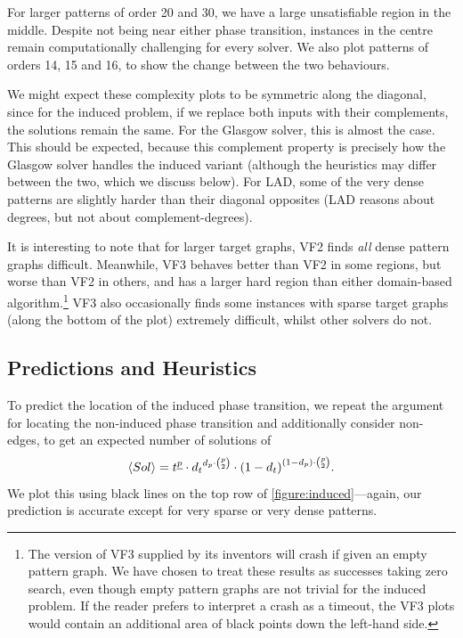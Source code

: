 \documentclass[twoside,11pt]{article}
\begin{document}
For larger patterns of order 20 and 30, we have a large unsatisfiable region in the middle. Despite
not being near either phase transition, instances in the centre remain computationally challenging
for every solver.  We also plot patterns of orders 14, 15 and 16, to show the change between the two
behaviours.

We might expect these complexity plots to be symmetric along the diagonal, since for the induced
problem, if we replace both inputs with their complements, the solutions remain the same.  For the
Glasgow solver, this is almost the case. This should be expected, because this complement property is
precisely how the Glasgow solver handles the induced variant (although the heuristics may differ
between the two, which we discuss below). For LAD, some of the very dense patterns are slightly
harder than their diagonal opposites (LAD reasons about degrees, but not about complement-degrees).

It is interesting to note that for larger target graphs, VF2 finds \emph{all} dense pattern graphs
difficult. Meanwhile, VF3 behaves better than VF2 in some regions, but worse than VF2 in others, and
has a larger hard region than either domain-based algorithm.\footnote{The version of
VF3 supplied by its inventors will crash if given an empty pattern graph. We have chosen to treat
these results as successes taking zero search, even though empty pattern graphs are not trivial for
the induced problem. If the reader prefers to interpret a crash as a timeout, the VF3 plots would
contain an additional area of black points down the left-hand side.} VF3 also occasionally finds
some instances with sparse target graphs (along the bottom of the plot) extremely difficult, whilst
other solvers do not.

\subsection{Predictions and Heuristics}

To predict the location of the induced phase transition, we repeat the argument for locating the
non-induced phase transition and additionally consider non-edges, to get an expected number of
solutions of \begin{equation}\label{equation:induced-prediction} \langle Sol \rangle = t^{\underline{p}} \cdot {d_t}^{d_p \cdot \binom{p}{2}} \cdot
{(1 - d_{t})}^{(1 - d_{p}) \cdot \binom{p}{2}} \textnormal{.} \end{equation} We plot this using black lines on
the top row of \cref{figure:induced}---again, our prediction is accurate except for very sparse or
very dense patterns.
\end{document}

